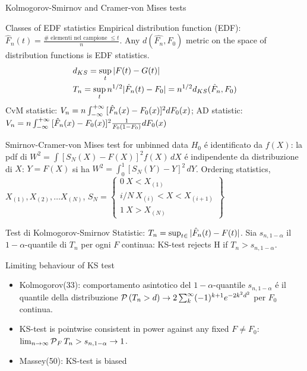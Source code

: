 \begin{frame}{Kolmogorov-Smirnov and Cramer-von Mises tests}
\begin{block}{Classes of EDF statistics}
	Empirical distribution function (EDF): $\hat{F}_n(t)=\frac{\#\text{ elementi nel campione }\leq t}{n}$. Any $d(\hat{F_n},F_0)$ metric on the space of distribution functions is EDF statistics.
	\begin{align*}
	&d_{KS}=\sup_t|F(t)-G(t)|\\
	&T_n=\sup_tn^{1/2}|\hat{F}_n(t)-F_0|=n^{1/2}d_{KS}(\hat{F}_n,F_0)
	\end{align*}
	CvM statistic: $V_n=n\int_{-\infty}^{+\infty}{}[\hat{F}_n(x)-F_0(x)]^2dF_0(x)$; AD statistic: $V_n=n\int_{-\infty}^{+\infty}{}[\hat{F}_n(x)-F_0(x)]^2\frac{1}{F_0(1-F_0)}dF_0(x)$
\end{block}
\end{frame}

\begin{frame}{Smirnov-Cramer-von Mises test for unbinned data}
$H_0$ \'e identificato da $f(X)$: la pdf di  $W^2=\int[S_N(X)-F(X)]^2f(X)\,dX$ \'e indipendente da distribuzione di $X$: $Y=F(X)$ si ha $W^2=\int_0^1[S_N(Y)-Y]^2\,dY$. Ordering statistics, $X_{(1)}, X_{(2)}, \ldots X_{(N)}$, $S_N=\left\{\begin{array}{c}0\ X<X_{(1)}\\i/N\ X_{(i)}<X<X_{(i+1)}\\1\ X>X_{(N)}\end{array}\right\}$

\end{frame}

\begin{frame}{Test di Kolmogorov-Smirnov }
Statistic: $T_n=\sup_{t\in\real}{|\hat{F}_n(t)-F(t)|}$. Sia $s_{n,1-\alpha}$ il $1-\alpha$-quantile di $T_n$ per ogni $F$ continua: KS-test rejects H if $T_n>s_{n,1-\alpha}$.
\begin{block}{Limiting behaviour of KS test}
\begin{itemize}
\item Kolmogorov(33): comportamento asintotico del $1-\alpha$-quantile $s_{n,1-\alpha}$ \'e il quantile della distribuzione $\operatorname{\mathcal{P}}{(T_n>d)}\to2\sum_k^{\infty}(-1)^{k+1}e^{-2k^2d^2}$ per $F_0$ continua.
\item KS-test is pointwise consistent in power against any fixed $F\neq F_0$: $\lim_{n\to\infty}\operatorname{\mathcal{P}}_F{T_n>s_{n,1-\alpha}}\to1$.
\item Massey(50): KS-test is biased
\end{itemize}
\end{block}
\end{frame}